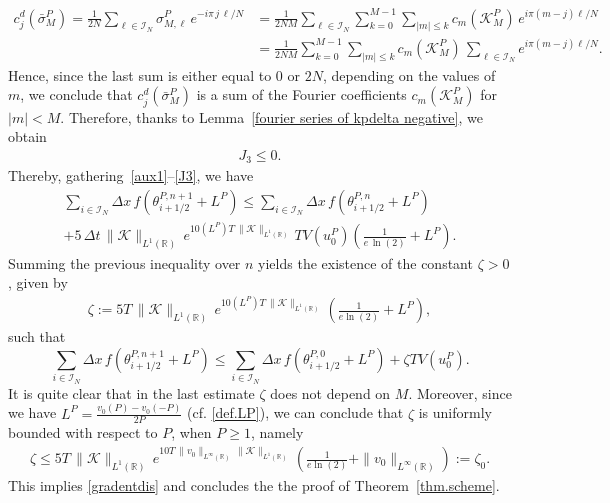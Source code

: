 \documentclass[11pt]{amsart}
\newcommand{\K}{\mathcal{K}}
\newcommand{\R}{\mathbb{R}}
\newcommand{\I}{\mathcal{I}_N}
\begin{document}
\begin{align*}
    c^d_j\left(\bar{\sigma}_M^P\right) = \frac{1}{2N} \sum_{\ell \in \I} \sigma_{M,\ell}^P \, e^{-i\pi \, j \, \ell/N} &= \frac{1}{2NM} \sum_{\ell\in\I} \sum_{k=0}^{M-1} \sum_{|m|\leq k} c_m(\K^P_M) \, e^{i\pi (m-j) \ell/N}\\
    &=\frac{1}{2NM} \sum_{k=0}^{M-1} \sum_{|m|\leq k} c_m(\K^P_M) \, \sum_{\ell\in\I} e^{i\pi (m-j) \ell/N}.
\end{align*}
Hence, since the last sum is either equal to $0$ or $2N$, depending on the values of $m$, we conclude that $c^d_j(\bar{\sigma}_M^P)$ is a sum of the Fourier coefficients $c_m(\K^P_M)$ for $|m|<M$. Therefore, thanks to Lemma~\ref{fourier series of kpdelta negative}, we obtain
\begin{align}\label{J3}
    J_3 \leq 0.
\end{align}
Thereby, gathering~\eqref{aux1}--\eqref{J3}, we have
\begin{multline}\label{gradentdis.onesteptime}
    \sum_{i\in\I} \Delta x\, f\left(\theta_{i +1/2}^{P, n+1} + L^P\right) 
\leq  \sum_{i \in\I} \Delta x \, f\left(\theta_{i + 1/2}^{P, n} + L^P\right) \\
+  5 \, \Delta t \, \|\K\|_{L^1(\R)} \, e^{10(L^P)T \, \|\K\|_{L^1(\R)}} \, TV(u^P_0) \left(\frac{1}{e \, \ln(2)} + L^P \right).
\end{multline}
Summing the previous inequality over $n$ yields the existence of the constant $\zeta>0$, given by
\begin{align*}
    \zeta := 5T \, \|\K\|_{L^1(\R)} \, e^{10 (L^P) T \, \|\K\|_{L^1(\R)}} \, \left(\frac{1}{e \ln(2)}+L^P\right),
\end{align*}
such that
$$
   \sum_{i\in\I} \Delta x\, f\left(\theta_{i +1/2}^{P, n+1} + L^P\right) 
\leq  \sum_{i \in\I} \Delta x \, f\left(\theta_{i + 1/2}^{P, 0} + L^P\right) +  \zeta TV(u^P_0).
$$
It is quite clear that in the last estimate  $\zeta$  does not depend on $M$. 
Moreover, since we have $L^P = \frac{v_0(P)-v_0(-P)}{2P}$ (cf. \eqref{def.LP}),  we can conclude that $\zeta$ is uniformly bounded with respect to $P$, when $P\ge 1$, namely
\begin{align}\label{defzeta}
    \zeta \leq 5T \, \|\K\|_{L^1(\R)} \, e^{10 T \,\|v_0\|_{L^\infty(\R)} \, \|\K\|_{L^1(\R)}} \, \left(\frac{1}{e \ln(2)}+\|v_0\|_{L^\infty(\R)}\right) :=  \zeta_0.
\end{align}
This implies \eqref{gradentdis} and concludes the the proof of Theorem~\ref{thm.scheme}.
\end{document}
